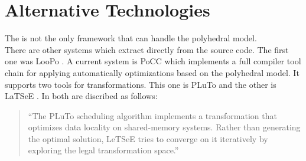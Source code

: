 \section[Alternative Technologies]{Alternative Technologies \cite{PolyhedralEmpiricalStudy}}
The \llvm is not the only framework that can handle the polyhedral model.\\
There are other systems which extract \scops directly from the source code.
The first one was LooPo \cite{loopo}.
A current system is PoCC \cite{pocc} which implements a full compiler tool chain for applying automatically optimizations based on the polyhedral model.
It supports two tools for transformations.
This one is PLuTo \cite{pluto} and the other is LaTSeE \cite{latsee}.
In \cite{PolyhedralEmpiricalStudy} both are discribed as follows:
\begin{quotation}\noindent
    \enquote{The PLuTo scheduling algorithm implements a transformation that optimizes data locality on shared-memory systems.
    Rather than generating the optimal solution, LeTSeE tries to converge on it iteratively by exploring the legal transformation space.}
\end{quotation}
